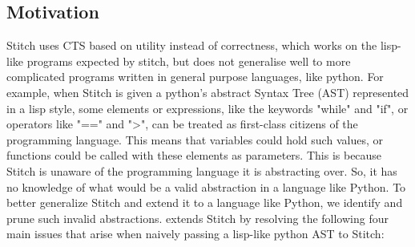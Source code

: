 \subsection{Motivation} %

Stitch uses CTS based on utility instead of correctness, which works on the lisp-like programs expected by stitch, but does not generalise well to more complicated programs written in general purpose languages, like python. 
For example, when Stitch is given a python's abstract Syntax Tree (AST) represented in a lisp style, 
some elements or expressions, like the keywords "while" and "if", or operators like "==" and ">", can be treated as first-class citizens of the programming language. This means that variables could hold such values, or functions could be called with these elements as parameters.
This is because Stitch is unaware of the programming language it is abstracting over. So, it has no knowledge of what would be a valid abstraction in a language like Python. 
To better generalize Stitch and extend it to a language like Python, we identify and prune such invalid abstractions. \toolname extends Stitch by resolving the following four main issues that arise when naively passing a lisp-like python AST to Stitch: 

